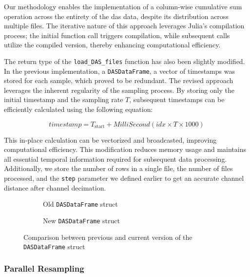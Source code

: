 Our methodology enables the implementation of a column-wise cumulative sum operation across the entirety of the \acrshort{das} data, despite its distribution across multiple files. The iterative nature of this approach leverages Julia's compilation process; the initial function call triggers compilation, while subsequent calls utilize the compiled version, thereby enhancing computational efficiency.

The return type of the \texttt{load\_DAS\_files} function has also been slightly modified. In the previous implementation, a \texttt{DASDataFrame}, a vector of timestamps was stored for each sample, which proved to be redundant. The revised approach leverages the inherent regularity of the sampling process. By storing only the initial timestamp and the sampling rate $T$, subsequent timestamps can be efficiently calculated using the following equation:

\begin{equation}
    timestamp = T_{\text{start}} + MilliSecond(idx \times T \times 1000)
\end{equation}


This in-place calculation can be vectorized and broadcasted, improving computational efficiency. This modification reduces memory usage and maintains all essential temporal information required for subsequent data processing. Additionally, we store the number of rows in a single file, the number of files processed, and the \texttt{step} parameter we defined earlier to get an accurate channel distance after channel decimation.\\

\begin{figure}[!h]
\centering
\begin{subfigure}{.45\textwidth}
  \centering
  
  \caption{Old \texttt{DASDataFrame} struct}
  \label{fig:olddasstc}
\end{subfigure}%
\hfill
\begin{subfigure}{.45\textwidth}
  \centering
  
  \caption{New \texttt{DASDataFrame} struct}
  \label{fig:newdasstc}
\end{subfigure}
\caption{Comparison between previous and current version of the \texttt{DASDataFrame} struct}
\label{fig:dasstccmp}
\end{figure}



\subsubsection{Parallel Resampling}


